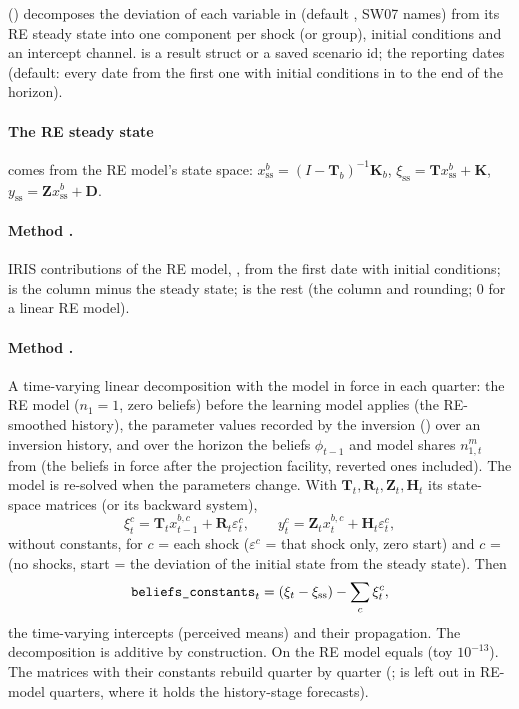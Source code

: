 \documentclass[11pt,a4paper]{article}
\DeclareRobustCommand{\codem}[1]{\texttt{\detokenize{#1}}}
\newcommand{\T}{\mathbf{T}}
\newcommand{\K}{\mathbf{K}}
\newcommand{\Rs}{\mathbf{R}}
\newcommand{\Z}{\mathbf{Z}}
\newcommand{\Hs}{\mathbf{H}}
\newcommand{\D}{\mathbf{D}}
\begin{document}
 () decomposes the deviation
of each variable in  (default , SW07 names) from its RE steady
state into one component per shock (or group), initial conditions and an intercept channel.
 is a result struct or a saved scenario id;  the reporting dates (default:
every date from the first one with initial conditions in  to the end of the
horizon).

\paragraph{The RE steady state} comes from the RE model's state space:
$x^b_{\text{ss}} = (I-\T_b)^{-1}\K_b$, $\xi_{\text{ss}} = \T x^b_{\text{ss}} + \K$,
$y_{\text{ss}} = \Z x^b_{\text{ss}} + \D$.

\paragraph{Method \codem{'iris'}.} IRIS contributions of the RE model,
, from the first date
with initial conditions;  is the  column minus the steady state;
 is the rest (the  column and rounding; 0 for a linear RE
model).

\paragraph{Method \codem{'tv'}.} A time-varying linear decomposition with the model in force in each
quarter: the RE model ($n_1=1$, zero beliefs) before the learning model applies (the RE-smoothed
history), the parameter values recorded by the inversion () over an
inversion history, and over the horizon the beliefs $\phi_{t-1}$ and model shares $n^m_{1,t}$ from
 (the beliefs in force after the projection facility, reverted ones included).
The model is re-solved when the parameters change. With $\T_t,\Rs_t,\Z_t,\Hs_t$ its state-space
matrices (or its backward system),
\begin{equation}\label{eq:tv}
  \xi^c_t = \T_t x^{b,c}_{t-1} + \Rs_t\varepsilon^c_t, \qquad y^c_t = \Z_t x^{b,c}_t + \Hs_t\varepsilon^c_t,
\end{equation}
without constants, for $c$ = each shock ($\varepsilon^c$ = that shock only, zero start) and
$c$ =  (no shocks, start = the deviation of the initial state from the steady state). Then
\begin{equation}
  \text{\codem{beliefs_constants}}_t = (\xi_t - \xi_{\text{ss}}) - \sum_c \xi^c_t ,
\end{equation}
the time-varying intercepts (perceived means) and their propagation. The decomposition is additive
by construction. On the RE model  equals  (toy $10^{-13}$). The matrices with
their constants rebuild  quarter by quarter (;
 is left out in RE-model quarters, where it holds the history-stage forecasts).
\end{document}

